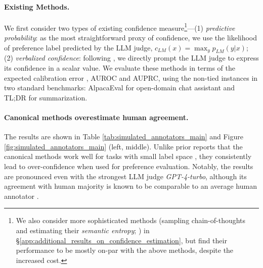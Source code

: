 \paragraph{Existing Methods.} We first consider two types of existing confidence measure\footnote{We also consider more sophisticated methods (\eg sampling chain-of-thoughts and estimating their \textit{semantic entropy}; \citealt{semantic-entropy}) in \S \ref{app:additional_results_on_confidence_estimation}, but find their performance to be mostly on-par with the above methods, despite the increased cost.}---(1) \textit{predictive probability}: as the most straightforward proxy of confidence, we use the likelihood of preference label predicted by the LLM judge, \ie $c_\textit{LM}(x) = \max_y p_\textit{LM}(y|x)$; (2) \textit{verbalized confidence}: following \cite{verbalized-confidence}, we directly prompt the LLM judge to express its confidence in a scalar value. We evaluate these methods in terms of the expected calibration error \citep{ece}, AUROC and AUPRC, using the non-tied instances in two standard benchmarks: AlpacaEval \citep{alpacafarm} for open-domain chat assistant and TL;DR \citep{summarize-from-human-feedback} for summarization.

\paragraph{Canonical methods overestimate human agreement.} 
The results are shown in Table \ref{tab:simulated_annotators_main} and Figure \ref{fig:simulated_annotators_main} (left, middle). Unlike prior reports that the canonical methods work well for tasks with small label space \citep{language-models-mostly-know-what-they-know, verbalized-confidence}, they consistently lead to over-confidence when used for preference evaluation. Notably, the results are pronounced even with the strongest LLM judge \textit{GPT-4-turbo}, although its agreement with human majority is known to be comparable to an average human annotator \citep{evaluation-metrics-in-the-era, mt-bench}.

